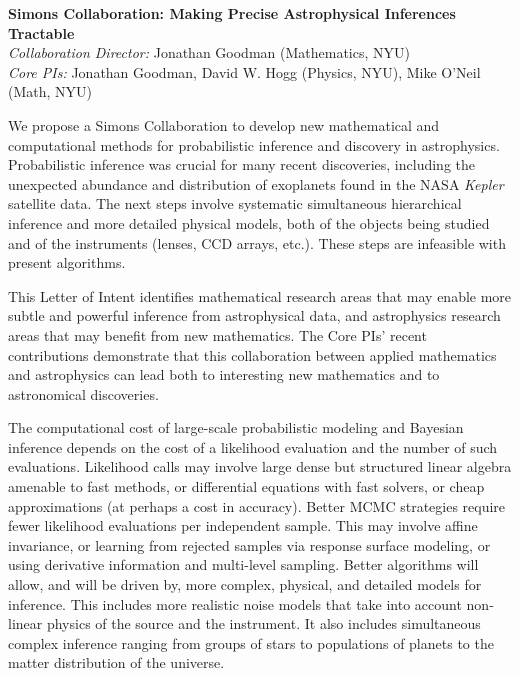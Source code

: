 \documentclass[11pt]{article}
\newcommand{\project}[1]{\textsl{#1}}
\begin{document}
\sloppy\sloppypar\thispagestyle{empty}

\begin{center}
\textbf{Simons Collaboration: Making Precise Astrophysical Inferences Tractable}\\
\textit{Collaboration Director:} Jonathan Goodman (Mathematics, NYU)\\
\textit{Core PIs:} Jonathan Goodman, David W. Hogg (Physics, NYU), Mike O'Neil (Math, NYU)
\end{center}
\smallskip

We propose a Simons Collaboration to develop new mathematical and computational 
methods for probabilistic inference and discovery in astrophysics.
Probabilistic inference was crucial for many recent discoveries,
including the unexpected abundance and distribution of
exoplanets found in the NASA \project{Kepler} satellite data.
The next steps involve systematic simultaneous hierarchical inference
and more detailed physical models, both of the objects being studied and of
the instruments (lenses, CCD arrays, etc.).
These steps are infeasible with present algorithms.

This Letter of Intent identifies mathematical research areas that may enable
more subtle and powerful inference from astrophysical data,
and astrophysics research areas that may benefit from new mathematics.
The Core PIs' recent contributions demonstrate that this collaboration
between applied mathematics and astrophysics
can lead both to interesting new mathematics and to astronomical discoveries.

The computational cost of large-scale probabilistic modeling and Bayesian 
inference depends on the cost of a likelihood evaluation and the number of such evaluations.
Likelihood calls may involve large dense but structured linear algebra
amenable to fast methods, or differential 
equations with fast solvers, or cheap approximations (at perhaps a cost in accuracy).
Better MCMC strategies require fewer likelihood evaluations per independent sample.
This may involve affine invariance, or learning from rejected samples
via response surface modeling, or using derivative information and
multi-level sampling.
Better algorithms will allow, and will be driven by, more complex, physical, and
detailed models for inference.
This includes more realistic noise models
that take into account non-linear physics of the source
and the instrument.
It also includes simultaneous complex inference ranging from groups of stars to
populations of planets to the matter distribution of the universe.
\end{document}
